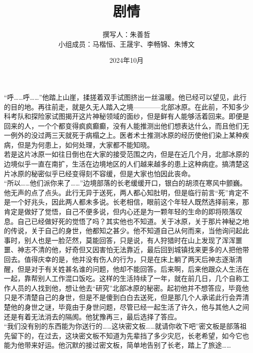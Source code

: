 \documentclass[a4paper]{article}
\begin{document}
	\title{剧情}
	\author{撰写人：朱善哲\\小组成员：马楷恒、王晟宇、李畅锦、朱博文}
	\date{2024年10月}
	\maketitle
	\section{}
		“呼……呼……”他踏上山崖，揉搓着双手试图挤出一丝温暖。他已经可以望见，此行的目的地。再往前走，就是久无人踏入之境————北部冰原。在此前，不知多少科考队和探险家试图揭开这片神秘领域的面纱，但是鲜有人能够活着回来。即便是回来的人，一个个都变得疯疯癫癫，没有人能推测出他们想表达什么，而且他们无一例外的没过两三天就死于病榻之上。医者术士推测冰原的经历使他们染上某种疾病，但是为何患上，如何处理，大家都不能知晓。\\
		\indent 若是这片冰原一如往日倒也在大家的接受范围之内，但是在近几个月，北部冰原的边境似乎一直在南扩，生活在边境地区的人们越来越多的患上这种病症。搞清楚这片冰原的秘密似乎已经变得刻不容缓，但是大家也怕因此丧命。\\
		\indent “所以……他们派你来了……”边境部落的长老缓缓开口，银白的胡须在寒风中颤巍。他无声的点了点头。此行无异于送死，两人都心知肚明，但是临行前言“死”肯定不是一个好兆头，因此两人都未多说。长老相信，眼前这个年轻人既然选择前来，那肯定是做好了觉悟，自己不便多说，但内心还是为一颗年轻的生命的即将陨落叹息。自己已经做好死的觉悟了吗？其实他也不知道。关于冰原，关于那片神秘之地的传说，关于自己的身世，他都知之甚少。他不知道自己从何而来，当他询问起此事时，别人也是一脸茫然，莫能回答，只是说，有人狩猎时在山上发现了浑浑噩噩、神志不清的他，好奇但又因害怕无法靠近，最后回到城镇找来更多的人把他带回去。值得庆幸的是，他并没有伤人的行为，只是在床上躺了两天后神志逐渐清醒，但是对于有关姓甚名谁的问题，他却不能回答。后来啊，后来他跟众人生活在一起，靠帮别人工作混口饭吃。这样的生活持续了一年，就在前几日，几个自称工作人员的人找到他，想让他去“研究”北部冰原的秘密。起初他并不想答应，毕竟他只是不清楚自己的身世，但是不是傻到白白去送死，但是那几个人承诺此行会弄清楚他的身世之谜，毕竟由于身世问题，尽管已经一起生活了许久，他与其他人之间还是有着无法消去的隔阂。他犹豫再三，最后选择了答应。\\
		\indent “我们没有别的东西能为你送行的……这块密文板……就请你收下吧”密文板是部落祖先留下的，在过去，这块密文板不知道为先辈挡了多少灾厄，长老希望，如今它也能为他带来好运。他沉默的接过密文板，简单地告别了长老，踏上了旅途……
\end{document}
